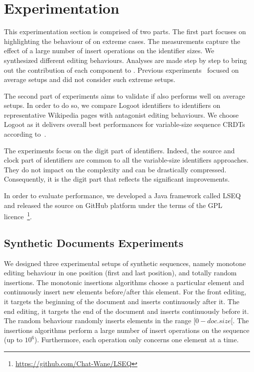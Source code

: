 \section{Experimentation}
\label{sec:validation}

This experimentation section is comprised of two parts. The first part focuses
on highlighting the behaviour of \NAME{} on extreme cases. The measurements
capture the effect of a large number of insert operations on the identifier
sizes. We synthesized different editing behaviours. Analyses are made step by
step to bring out the contribution of each component to \NAME{}. Previous
experiments~\cite{ahmed2011evaluating,preguica2009commutative,weiss2009logoot}
focused on average setups and did not consider such extreme setups.

The second part of experiments aims to validate if \NAME{} also performs well
on average setups.  In order to do so, we compare Logoot identifiers to \NAME{}
identifiers on representative Wikipedia pages with antagonist editing
behaviours. We choose Logoot as it delivers overall best performances for
variable-size sequence CRDTs according to~\cite{ahmed2011evaluating}.

The experiments focus on the digit part of identifiers. Indeed, the source and
clock part of identifiers are common to all the variable-size identifiers
approaches. They do not impact on the complexity and can be drastically
compressed. Consequently, it is the digit part that reflects the significant
improvements.

In order to evaluate \NAME{} performance, we developed a Java framework called
LSEQ and released the source on GitHub platform under the terms of the GPL
licence~\footnote{\url{https://github.com/Chat-Wane/LSEQ}}.

\subsection{Synthetic Documents Experiments}
\label{ssec:components}

We designed three experimental setups of synthetic sequences, namely monotone
editing behaviour in one position (first and last position), and totally random
insertions. The monotonic insertions algorithms choose a particular element and
continuously insert new elements before/after this element. For the front
editing, it targets the beginning of the document and inserts
continuously after it. The end editing, it targets the end of the
document and inserts continuously before it. The random behaviour randomly
inserts elements in the range $[0-doc.size[$. The insertions algorithms perform
a large number of insert operations on the sequence (up to
$10^6$). Furthermore, each operation only concerns one element at a time.

